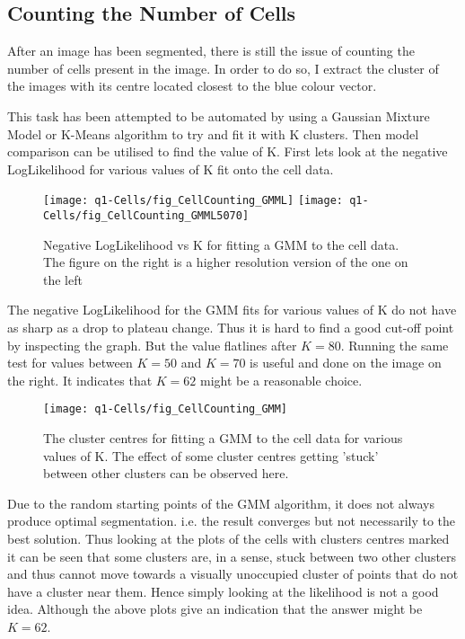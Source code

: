 \documentclass{article}
\begin{document}

\subsection{Counting the Number of Cells}
After an image has been segmented, there is still the issue of counting the number of cells present in the image. In order to do so, I extract the cluster of the images with its centre located closest to the blue colour vector.

This task has been attempted to be automated by using a Gaussian Mixture Model or K-Means algorithm to try and fit it with K clusters. Then model comparison can be utilised to find the value of K. First lets look at the negative LogLikelihood for various values of K fit onto the cell data.

\begin{figure}[h!]
	\centering
	\texttt{[image: q1-Cells/fig\_CellCounting\_GMML]}
	\texttt{[image: q1-Cells/fig\_CellCounting\_GMML5070]}
	\caption{Negative LogLikelihood vs K for fitting a GMM to the cell data. The figure on the right is a higher resolution version of the one on the left}
\end{figure}

The negative LogLikelihood for the GMM fits for various values of K do not have as sharp as a drop to plateau change. Thus it is hard to find a good cut-off point by inspecting the graph. But the value flatlines after $K=80$. Running the same test for values between $K=50$ and $K=70$ is useful and done on the image on the right. It indicates that $K=62$ might be a reasonable choice.

\begin{figure}[h!]
	\centering
	\texttt{[image: q1-Cells/fig\_CellCounting\_GMM]}
	\caption{The cluster centres for fitting a GMM to the cell data for various values of K. The effect of some cluster centres getting 'stuck' between other clusters can be observed here.}
\end{figure}

Due to the random starting points of the GMM algorithm, it does not always produce optimal segmentation. i.e. the result converges but not necessarily to the best solution. Thus looking at the plots of the cells with clusters centres marked it can be seen that some clusters are, in a sense, stuck between two other clusters and thus cannot move towards a visually unoccupied cluster of points that do not have a cluster near them. Hence simply looking at the likelihood is not a good idea. Although the above plots give an indication that the answer might be $K=62$.
\end{document}
